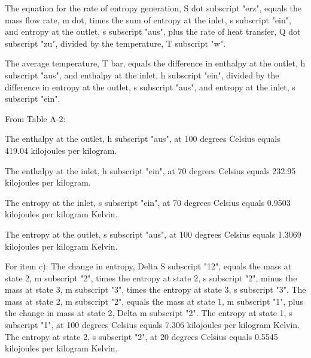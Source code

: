 The equation for the rate of entropy generation, S dot subscript "erz", equals the mass flow rate, m dot, times the sum of entropy at the inlet, s subscript "ein", and entropy at the outlet, s subscript "aus", plus the rate of heat transfer, Q dot subscript "zu", divided by the temperature, T subscript "w".

The average temperature, T bar, equals the difference in enthalpy at the outlet, h subscript "aus", and enthalpy at the inlet, h subscript "ein", divided by the difference in entropy at the outlet, s subscript "aus", and entropy at the inlet, s subscript "ein".

From Table A-2:

The enthalpy at the outlet, h subscript "aus", at 100 degrees Celsius equals 419.04 kilojoules per kilogram.

The enthalpy at the inlet, h subscript "ein", at 70 degrees Celsius equals 232.95 kilojoules per kilogram.

The entropy at the inlet, s subscript "ein", at 70 degrees Celsius equals 0.9503 kilojoules per kilogram Kelvin.

The entropy at the outlet, s subscript "aus", at 100 degrees Celsius equals 1.3069 kilojoules per kilogram Kelvin.

For item c):
The change in entropy, Delta S subscript "12", equals the mass at state 2, m subscript "2", times the entropy at state 2, s subscript "2", minus the mass at state 3, m subscript "3", times the entropy at state 3, s subscript "3".
The mass at state 2, m subscript "2", equals the mass at state 1, m subscript "1", plus the change in mass at state 2, Delta m subscript "2".
The entropy at state 1, s subscript "1", at 100 degrees Celsius equals 7.306 kilojoules per kilogram Kelvin.
The entropy at state 2, s subscript "2", at 20 degrees Celsius equals 0.5545 kilojoules per kilogram Kelvin.
